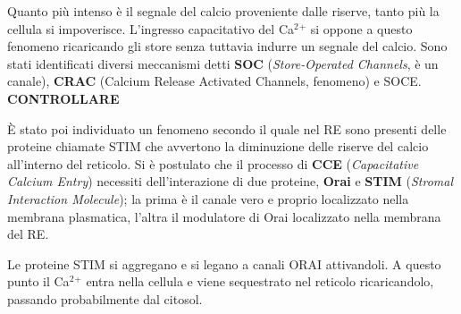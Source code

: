 \documentclass[]{article}
\begin{document}
Quanto più intenso è il segnale del calcio proveniente dalle riserve,
tanto più la cellula si impoverisce. L'ingresso capacitativo del
Ca\(^2\)\(^+\) si oppone a questo fenomeno ricaricando gli store senza
tuttavia indurre un segnale del calcio. Sono stati identificati diversi
meccanismi detti \textbf{SOC} (\emph{Store-Operated Channels}, è un
canale), \textbf{CRAC} (Calcium Release Activated Channels, fenomeno) e
SOCE. \textbf{CONTROLLARE}

È stato poi individuato un fenomeno secondo il quale nel RE sono
presenti delle proteine chiamate STIM che avvertono la diminuzione delle
riserve del calcio all'interno del reticolo. Si è postulato che il
processo di \textbf{CCE} (\emph{Capacitative Calcium Entry}) necessiti
dell'interazione di due proteine, \textbf{Orai} e \textbf{STIM}
(\emph{Stromal Interaction Molecule}); la prima è il canale vero e
proprio localizzato nella membrana plasmatica, l'altra il modulatore di
Orai localizzato nella membrana del RE.

Le proteine STIM si aggregano e si legano a canali ORAI attivandoli. A
questo punto il Ca\(^2\)\(^+\) entra nella cellula e viene sequestrato
nel reticolo ricaricandolo, passando probabilmente dal citosol.
\end{document}
